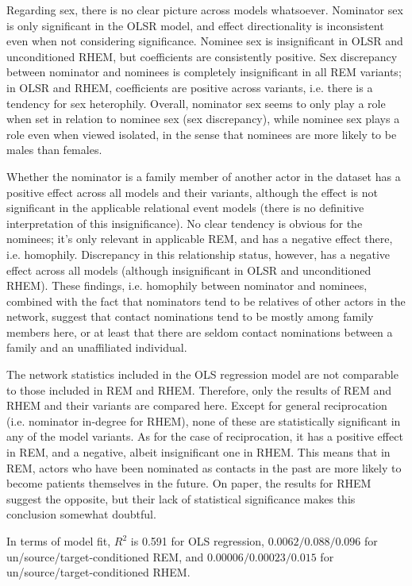 Regarding sex, there is no clear picture across models whatsoever. Nominator sex is only significant in the OLSR model, and effect directionality is inconsistent even when not considering significance. Nominee sex is insignificant in OLSR and unconditioned RHEM, but coefficients are consistently positive. Sex discrepancy between nominator and nominees is completely insignificant in all REM variants; in OLSR and RHEM, coefficients are positive across variants, i.e. there is a tendency for sex heterophily. Overall, nominator sex seems to only play a role when set in relation to nominee sex (sex discrepancy), while nominee sex plays a role even when viewed isolated, in the sense that nominees are more likely to be males than females.

Whether the nominator is a family member of another actor in the dataset has a positive effect across all models and their variants, although the effect is not significant in the applicable relational event models (there is no definitive interpretation of this insignificance). No clear tendency is obvious for the nominees; it's only relevant in applicable REM, and has a negative effect there, i.e. homophily. Discrepancy in this relationship status, however, has a negative effect across all models (although insignificant in OLSR and unconditioned RHEM). These findings, i.e. homophily between nominator and nominees, combined with the fact that nominators tend to be relatives of other actors in the network, suggest that contact nominations tend to be mostly among family members here, or at least that there are seldom contact nominations between a family and an unaffiliated individual.

The network statistics included in the OLS regression model are not comparable to those included in REM and RHEM. Therefore, only the results of REM and RHEM and their variants are compared here. Except for general reciprocation (i.e. nominator in-degree for RHEM), none of these are statistically significant in any of the model variants. As for the case of reciprocation, it has a positive effect in REM, and a negative, albeit insignificant one in RHEM. This means that in REM, actors who have been nominated as contacts in the past are more likely to become patients themselves in the future. On paper, the results for RHEM suggest the opposite, but their lack of statistical significance makes this conclusion somewhat doubtful.

In terms of model fit, $R^2$ is 0.591 for OLS regression, $0.0062/0.088/0.096$ for un/source/target-conditioned REM, and $0.00006/0.00023/0.015$ for un/source/target-conditioned RHEM.

